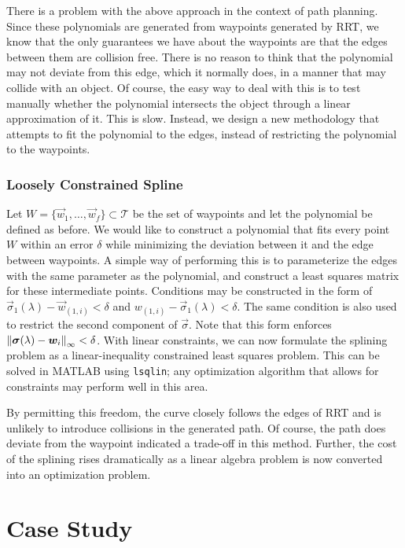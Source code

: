There is a problem with the above approach in the context of path planning. Since these polynomials are generated from waypoints generated by RRT, we know that the only guarantees we have about the waypoints are that the edges between them are collision free. There is no reason to think that the polynomial may not deviate from this edge, which it normally does, in a manner that may collide with an object. Of course, the easy way to deal with this is to test manually whether the polynomial intersects the object through a linear approximation of it. This is slow. Instead, we design a new methodology that attempts to fit the polynomial to the edges, instead of restricting the polynomial to the waypoints.

\subsection{Loosely Constrained Spline}\label{sec:restrictpolyfit}
Let $W=\{\vec{w}_1, \dots, \vec{w}_f\}\subset\mathcal{T}$ be the set of waypoints and let the polynomial be defined as before. We would like to construct a polynomial that fits every point $W$ within an error $\delta$ while minimizing the deviation between it and the edge between waypoints. A simple way of performing this is to parameterize the edges with the same parameter as the polynomial, and construct a least squares matrix for these intermediate points. Conditions may be constructed in the form of $\vec{\sigma}_1(\lambda) - \vec{w}_{(1,i)} < \delta$ and $w_{(1,i)} - \vec{\sigma}_1(\lambda) < \delta$. The same condition is also used to restrict the second component of $\vec{\sigma}$. Note that this form enforces $\mathop{}\!\left\| \bm{\sigma}(\lambda) - \bm{w}_i \right\|_\infty < \delta$. With linear constraints, we can now formulate the splining problem as a linear-inequality constrained least squares problem. This can be solved in MATLAB using \texttt{lsqlin}; any optimization algorithm that allows for constraints may perform well in this area.

By permitting this freedom, the curve closely follows the edges of RRT and is unlikely to introduce collisions in the generated path. Of course, the path does deviate from the waypoint indicated a trade-off in this method. Further, the cost of the splining rises dramatically as a linear algebra problem is now converted into an optimization problem.

\chapter{Case Study}

